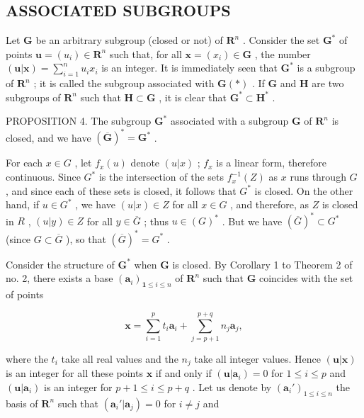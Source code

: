 \subsection{ASSOCIATED SUBGROUPS}

Let \(\mathbf{G}\) be an arbitrary subgroup (closed or not) of \(\mathbf{R}^n\) . Consider the set \(\mathbf{G}^*\) of points \(\boldsymbol{u} = (u_i) \in \mathbf{R}^n\) such that, for all \(\boldsymbol{x} = (x_i) \in \mathbf{G}\) , the number \((\boldsymbol{u}| \boldsymbol{x}) = \sum_{i=1}^{n} u_i x_i\) is an integer. It is immediately seen that \(\mathbf{G}^*\) is a subgroup of \(\mathbf{R}^n\) ; it is called the subgroup associated with \(\mathbf{G}(*)\) . If \(\mathbf{G}\) and \(\mathbf{H}\) are two subgroups of \(\mathbf{R}^n\) such that \(\mathbf{H} \subset \mathbf{G}\) , it is clear that \(\mathbf{G}^* \subset \mathbf{H}^*\) .

PROPOSITION 4. The subgroup \(\mathbf{G}^*\) associated with a subgroup \(\mathbf{G}\) of \(\mathbf{R}^n\) is closed, and we have \((\overline{\mathbf{G}})^* = \mathbf{G}^*\) .

For each \(x \in G\) , let \(f_x(u)\) denote \((u|x)\) ; \(f_x\) is a linear form, therefore continuous. Since \(G^*\) is the intersection of the sets \(f_x^{-1}(Z)\) as \(x\) runs through \(G\) , and since each of these sets is closed, it follows that \(G^*\) is closed. On the other hand, if \(u \in G^*\) , we have \((u|x) \in Z\) for all \(x \in G\) , and therefore, as \(Z\) is closed in \(R\) , \((u|y) \in Z\) for all \(y \in \overline{G}\) ; thus \(u \in (G)^*\) . But we have \((\overline{G})^* \subset G^*\) (since \(G \subset \overline{G}\) ), so that \((\overline{G})^* = G^*\) .

Consider the structure of \(\mathbf{G}^*\) when \(\mathbf{G}\) is closed. By Corollary 1 to Theorem 2 of no. 2, there exists a base \((\pmb{a}_i)_{\mathbf{1} \leqslant i \leqslant n}\) of \(\mathbf{R}^n\) such that \(\mathbf{G}\) coincides with the set of points

\[
\boldsymbol {x} = \sum_ {i = 1} ^ {p} t _ {i} \boldsymbol {a} _ {i} + \sum_ {j = p + 1} ^ {p + q} n _ {j} \boldsymbol {a} _ {j},
\]

where the \(t_i\) take all real values and the \(n_j\) take all integer values. Hence \((\boldsymbol{u}|\boldsymbol{x})\) is an integer for all these points \(\boldsymbol{x}\) if and only if \((\boldsymbol{u}|\boldsymbol{a}_i) = 0\) for \(1 \leqslant i \leqslant p\) and \((\boldsymbol{u}|\boldsymbol{a}_i)\) is an integer for \(p + 1 \leqslant i \leqslant p + q\) . Let us denote by \((\boldsymbol{a}_i')_{1 \leqslant i \leqslant n}\) the basis of \(\mathbf{R}^n\) such that \((\boldsymbol{a}_i'|\boldsymbol{a}_j) = 0\) for \(i \neq j\) and

